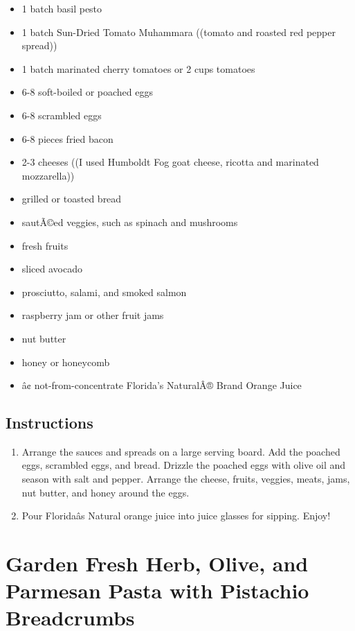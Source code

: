 \documentclass[
  letterpaper,
  DIV=11,
  numbers=noendperiod,
  titlepage=false]{scrreprt}
\providecommand{\tightlist}{%
  \setlength{\itemsep}{0pt}\setlength{\parskip}{0pt}}\usepackage{longtable,booktabs,array}
\begin{document}
\begin{itemize}
\tightlist
\item
  1 batch basil pesto
\item
  1 batch Sun-Dried Tomato Muhammara ((tomato and roasted red pepper
  spread))
\item
  1 batch marinated cherry tomatoes or 2 cups tomatoes
\item
  6-8 soft-boiled or poached eggs
\item
  6-8 scrambled eggs
\item
  6-8 pieces fried bacon
\item
  2-3 cheeses ((I used Humboldt Fog goat cheese, ricotta and marinated
  mozzarella))
\item
  grilled or toasted bread
\item
  sautÃ©ed veggies, such as spinach and mushrooms
\item
  fresh fruits
\item
  sliced avocado
\item
  prosciutto, salami, and smoked salmon
\item
  raspberry jam or other fruit jams
\item
  nut butter
\item
  honey or honeycomb
\item
  â¢ not-from-concentrate Florida's NaturalÂ® Brand Orange Juice
\end{itemize}

\section{Instructions}\label{instructions-93}

\begin{enumerate}
\def\labelenumi{\arabic{enumi}.}
\tightlist
\item
  Arrange the sauces and spreads on a large serving board. Add the
  poached eggs, scrambled eggs, and bread. Drizzle the poached eggs with
  olive oil and season with salt and pepper. Arrange the cheese, fruits,
  veggies, meats, jams, nut butter, and honey around the eggs.
\item
  Pour Floridaâs Natural orange juice into juice glasses for sipping.
  Enjoy!
\end{enumerate}


\chapter{Garden Fresh Herb, Olive, and Parmesan Pasta with Pistachio
Breadcrumbs}\label{garden-fresh-herb-olive-and-parmesan-pasta-with-pistachio-breadcrumbs}
\end{document}
